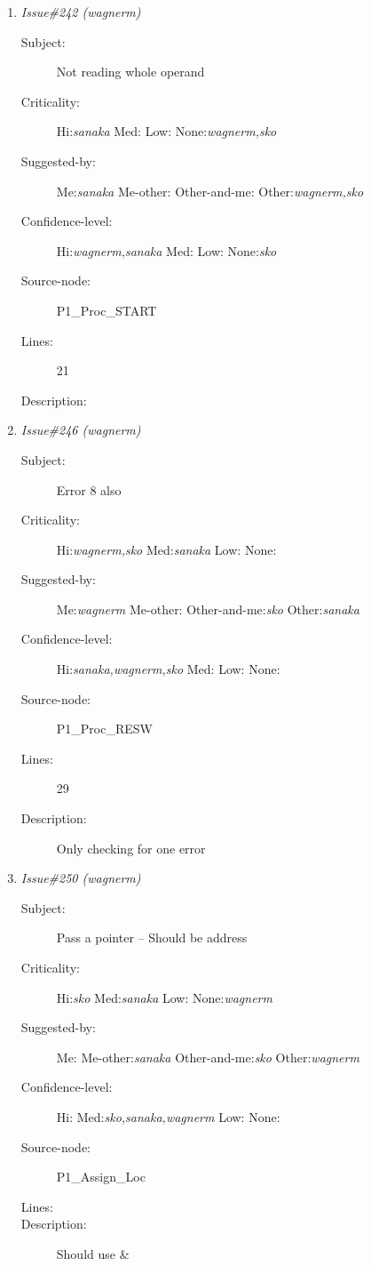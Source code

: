 \begin{enumerate}
\begin{description}
\item [Lines:] 57

\item [Description:] This will not store the whole op code !
\end{description}
\item {\it Issue\#242 (wagnerm)}
\begin{description}
\item [Subject:] Not reading whole operand
\item [Criticality:] Hi:{\it sanaka} Med:{\it } Low:{\it } None:{\it wagnerm,sko}
\item [Suggested-by:] Me:{\it sanaka} Me-other:{\it } Other-and-me:{\it } Other:{\it wagnerm,sko}
\item [Confidence-level:] Hi:{\it wagnerm,sanaka} Med:{\it } Low:{\it } None:{\it sko}
\item [Source-node:] P1\_Proc\_START

\item [Lines:] 21

\item [Description:] 
\end{description}
\item {\it Issue\#246 (wagnerm)}
\begin{description}
\item [Subject:] Error 8 also
\item [Criticality:] Hi:{\it wagnerm,sko} Med:{\it sanaka} Low:{\it } None:{\it }
\item [Suggested-by:] Me:{\it wagnerm} Me-other:{\it } Other-and-me:{\it sko} Other:{\it sanaka}
\item [Confidence-level:] Hi:{\it sanaka,wagnerm,sko} Med:{\it } Low:{\it } None:{\it }
\item [Source-node:] P1\_Proc\_RESW

\item [Lines:] 29

\item [Description:] Only checking for one error
\end{description}
\item {\it Issue\#250 (wagnerm)}
\begin{description}
\item [Subject:] Pass a pointer -- Should be address
\item [Criticality:] Hi:{\it sko} Med:{\it sanaka} Low:{\it } None:{\it wagnerm}
\item [Suggested-by:] Me:{\it } Me-other:{\it sanaka} Other-and-me:{\it sko} Other:{\it wagnerm}
\item [Confidence-level:] Hi:{\it } Med:{\it sko,sanaka,wagnerm} Low:{\it } None:{\it }
\item [Source-node:] P1\_Assign\_Loc

\item [Lines:] 

\item [Description:] Should use \&
\end{description}
\end{enumerate}
